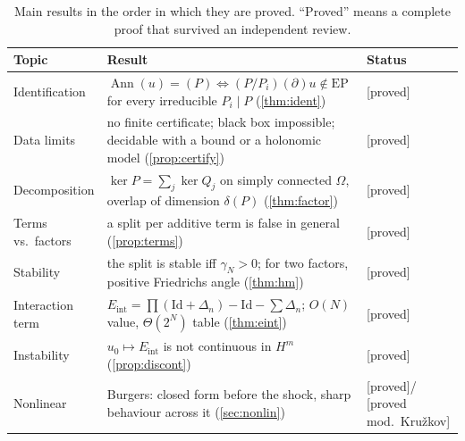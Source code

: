 \documentclass[11pt]{article}
\theoremstyle{plain}
\theoremstyle{definition}
\theoremstyle{remark}
\DeclareMathOperator{\Ann}{Ann}             %
\newcommand{\EP}{\mathrm{EP}}               %
\newcommand{\Id}{\mathrm{Id}}
\newcommand{\Eint}{E_{\mathrm{int}}}        %
\newcommand{\gN}{\gamma_{N}}                %
\newcommand{\badge}[2]{\textcolor{#1}{\textsf{\footnotesize[#2]}}}
\newcommand{\proved}[1][]{\badge{cC}{proved#1}}
\newcommand{\modulo}[1]{\badge{cD}{proved mod.\ #1}}
\begin{document}
\begin{table}[tbp]
\centering\small
\caption{Main results in the order in which they are proved. ``Proved'' means a complete proof that survived an independent review.}\label{tab:results}
\begin{tabular}{@{}p{2.6cm}p{7.4cm}p{2.6cm}@{}}
\toprule
Topic & Result & Status\\\midrule
Identification & $\Ann(u)=(P)\iff(P/P_i)(\partial)u\notin\EP$ for every irreducible $P_i\mid P$ (\cref{thm:ident}) & \proved\\
Data limits & no finite certificate; black box impossible; decidable with a bound or a holonomic model (\cref{prop:certify}) & \proved\\
Decomposition & $\ker P=\sum_j\ker Q_j$ on simply connected $\Omega$, overlap of dimension $\delta(P)$ (\cref{thm:factor}) & \proved\\
Terms vs.\ factors & a split per additive term is false in general (\cref{prop:terms}) & \proved\\
Stability & the split is stable iff $\gN>0$; for two factors, positive Friedrichs angle (\cref{thm:hm}) & \proved\\
Interaction term & $\Eint=\prod(\Id+\Delta_n)-\Id-\sum\Delta_n$; $O(N)$ value, $\Theta(2^N)$ table (\cref{thm:eint}) & \proved\\
Instability & $u_0\mapsto\Eint$ is not continuous in $H^m$ (\cref{prop:discont}) & \proved\\
Nonlinear & Burgers: closed form before the shock, sharp behaviour across it (\cref{sec:nonlin}) & \proved / \modulo{Kru\v zkov}\\
\bottomrule
\end{tabular}
\end{table}
\end{document}
